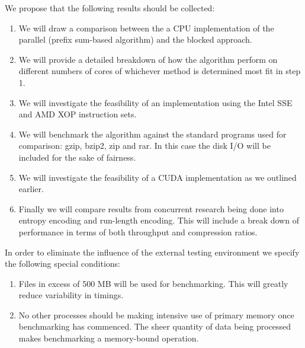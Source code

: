 \documentclass{acm_proc_article-sp}
\begin{document}
We propose that the following results should be collected:
\begin{enumerate}
 \item We will draw a comparison between the a CPU implementation of the parallel (prefix sum-based algorithm) and the blocked approach.
 \item We will provide a detailed breakdown of how the algorithm perform on different numbers of cores of whichever method is determined most fit in step 1.
 \item We will investigate the feasibility of an implementation using the Intel SSE and AMD XOP instruction sets.
 \item We will benchmark the algorithm against the standard programs used for comparison: gzip, bzip2, zip and rar. In this case the disk I/O will be included for the sake of fairness.
 \item We will investigate the feasibility of a CUDA implementation as we outlined earlier.
 \item Finally we will compare results from concurrent research being done into entropy encoding and run-length encoding. This will include a break down of performance in terms of both throughput and compression ratios.
\end{enumerate}

In order to eliminate the influence of the external testing environment we specify the following special conditions:
\begin{enumerate}
 \item Files in excess of 500 MB will be used for benchmarking. This will greatly reduce variability in timings.
 \item No other processes should be making intensive use of primary memory once benchmarking has commenced. The sheer quantity of data being processed makes benchmarking a memory-bound operation.
\end{enumerate}
\end{document}
